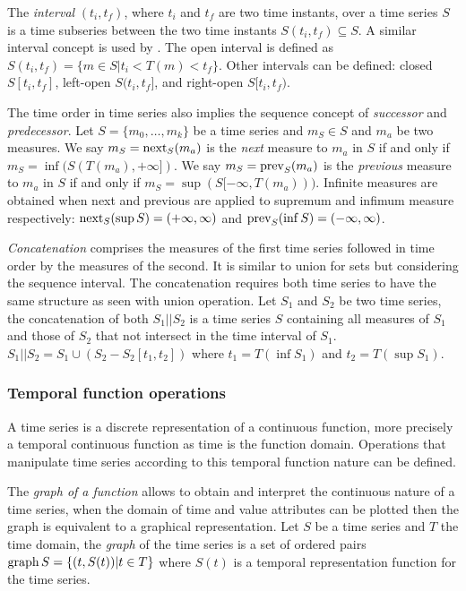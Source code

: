The \emph{interval} $(t_i,t_f)$, where $t_i$ and $t_f$ are two time
instants, over a time series $S$ is a time subseries between the two
time instants $S(t_i,t_f) \subseteq S$. A similar interval concept
is used by \cite{last:hetland}. The open interval is defined as
$S(t_i,t_f)=\{m\in S | t_i<T(m)<t_f\}$. Other intervals can be
defined: closed $S[t_i,t_f]$, left-open $S(t_i,t_f]$, and right-open
$S[t_i,t_f)$.

The time order in time series also implies the sequence concept of
\emph{successor} and \emph{predecessor}.  Let $S=\{m_0, \ldots, m_k\}$
be a time series and $m_S\in S$ and $m_a$ be two measures. We say
$m_S=\operatorname*{next}_S(m_a)$ is the \emph{next} measure to $m_a$ in $S$ if and
only if $m_S=\inf(S(T(m_a),+\infty])$.  We say $m_S=\operatorname*{prev}_S(m_a)$ is
the \emph{previous} measure to $m_a$ in $S$ if and only if
$m_S=\sup(S[-\infty,T(m_a)))$. %
Infinite measures are obtained when next and previous are applied to
supremum and infimum measure respectively: $\operatorname*{next}_S(\sup
S)=(+\infty,\infty)$ and $\operatorname*{prev}_S(\inf S)=(-\infty,\infty)$.



\emph{Concatenation} comprises the measures of the first time series
followed in time order by the measures of the second. It is similar to
union for sets but considering the sequence interval. The
concatenation requires both time series to have the same structure as
seen with union operation.  Let $S_1$ and $S_2$ be two time series,
the concatenation of both $S_1 || S_2$ is a time series $S$ containing
all measures of $S_1$ and those of $S_2$ that not intersect in the
time interval of $S_1$.  $S_1 || S_2 = S_1 \cup ( S_2 - S_2[t_1,t_2]
)$ where $t_1=T(\inf S_1)$ and $t_2=T(\sup S_1)$.



\subsubsection{Temporal function operations}
A time series is a discrete representation of a continuous function,
more precisely a temporal continuous function as time is the function
domain. Operations that manipulate time series according to this
temporal function nature can be defined.

The \emph{graph of a function} allows to obtain and interpret the
continuous nature of a time series, when the domain of time and value
attributes can be plotted then the graph is equivalent to a graphical
representation.  Let $S$ be a time series and $T$ the time domain, the
\emph{graph} of the time series is a set of ordered pairs $\operatorname*{graph} S =
\{ (t,S(t)) | t\in T \}$ where $S(t)$ is a temporal representation
function for the time series.


